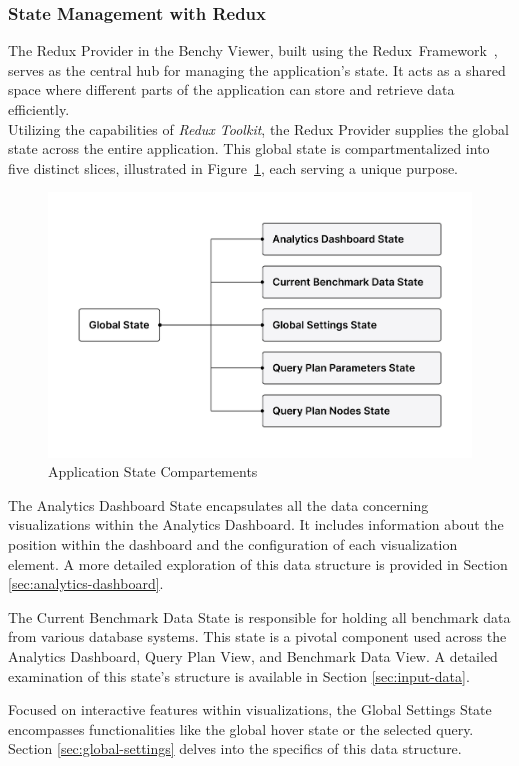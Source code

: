 \subsubsection{State Management with Redux}
The Redux Provider in the Benchy Viewer, built using the Redux~Framework~\parencite{Redux}, serves as the central hub for managing the application's state. It acts as a shared space where different parts of the application can store and retrieve data efficiently.\\
Utilizing the capabilities of \textit{Redux Toolkit}\parencite{redux-toolkit}, the Redux Provider supplies the global state across the entire application. This global state is compartmentalized into five distinct slices, illustrated in Figure~\ref{fig:global-state}, each serving a unique purpose.

\begin{figure}[h]
  \centering
  \includegraphics[width=0.8\linewidth]{figures/global-state.png}
  \caption{Application State Compartements}
  \label{fig:global-state}
\end{figure}

The Analytics Dashboard State encapsulates all the data concerning visualizations within the Analytics Dashboard. It includes information about the position within the dashboard and the configuration of each visualization element. A more detailed exploration of this data structure is provided in Section \ref{sec:analytics-dashboard}.

The Current Benchmark Data State is responsible for holding all benchmark data from various database systems. This state is a pivotal component used across the Analytics Dashboard, Query Plan View, and Benchmark Data View. A detailed examination of this state's structure is available in Section \ref{sec:input-data}.

Focused on interactive features within visualizations, the Global Settings State encompasses functionalities like the global hover state or the selected query. Section \ref{sec:global-settings} delves into the specifics of this data structure.

